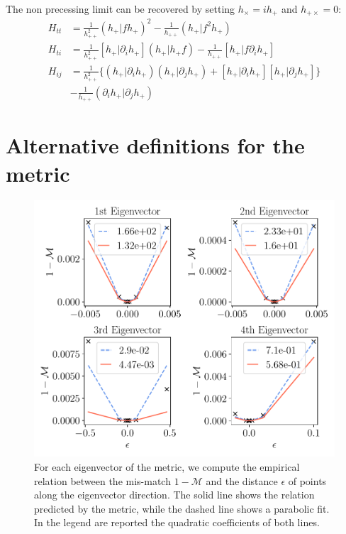 \documentclass[twocolumn,showpacs,preprintnumbers,nofootinbib,prd,
superscriptaddress,10pt]{revtex4-2}
\newcommand{\rescalar}[2]{( #1 |#2 )}
\newcommand{\imscalar}[2]{[ #1|#2 ]}
\begin{document}
The non precessing limit can be recovered by setting $h_\times = i h_+$ and $h_{+\times} = 0$:
\begin{align}
	H_{tt} &= \frac{1}{h_{++}^{2}} \rescalar{{h_+}}{f{h_+}}^2 - \frac{1}{h_{++}} \rescalar{h_+}{f^2 {h_+}} \label{eq:H_tt_grad_NP} \\
	H_{ti} &= \frac{1}{h_{++}^{2}} \imscalar{h_+}{\partial_i {h_+}} \rescalar{{h_+}}{{h_+}f}
		- \frac{1}{h_{++}} \imscalar{h_+}{f \partial_i{h_+}} \label{eq:H_ti_grad_NP} \\
	H_{ij} &=  \frac{1}{h_{++}^{2}} \Big\{ \rescalar{h_+}{\partial_i {h_+}} \rescalar{{h_+}}{\partial_j {h_+}} +\imscalar{h_+}{\partial_i {h_+}} \imscalar{h_+}{\partial_j {h_+}} \Big\} \nonumber \\
	&- \frac{1}{h_{++}} \rescalar{\partial_i h_+}{\partial_j {h_+}} \label{eq:H_ij_grad_NP} 
\end{align}

\section{Alternative definitions for the metric}\label{app:metric_definition}

\begin{figure}[t]
	\centering
	\includegraphics[scale = .52]{parabolae}
	\caption{For each eigenvector of the metric, we compute the empirical relation between the mis-match $1-\mathcal{M}$ and the distance $\epsilon$ of points along the eigenvector direction. The solid line shows the relation predicted by the metric, while the dashed line shows a parabolic fit. In the legend are reported the quadratic coefficients of both lines.}
	\label{fig:parabolae}
\end{figure}
\end{document}
